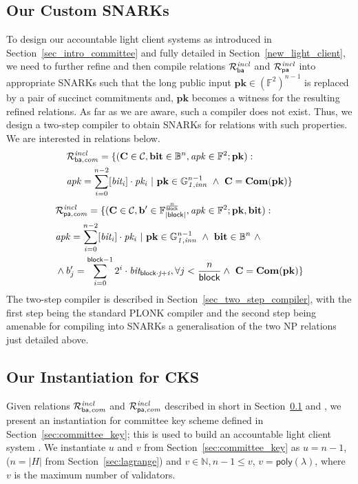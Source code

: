 \subsection{Our Custom SNARKs}
\label{sec_custom_snarks}
To design our accountable light client systems as introduced in Section~\ref{sec_intro_committee} and fully detailed in Section~\ref{new_light_client}, 
we need to further refine and then compile relations $\mathcal{R}^{\mathit{incl}}_{\mathsf{ba}}$ and $\mathcal{R}^{\mathit{incl}}_{\mathsf{pa}}$ into appropriate SNARKs such that 
the long public input $\mathbf{pk} \in ({\mathbb{F}^2})^{n-1}$ is replaced by a 
pair of succinct commitments and, $\mathbf{pk}$ becomes a witness for the resulting refined relations. As far as we are aware, such a compiler does not exist. 
Thus, we design a two-step compiler to obtain SNARKs for relations with such properties. We are interested in relations below. 
 \begin{align*}
& {\mathcal{R}^{\mathit{incl}}_{\mathsf{ba},\mathit{com}}} = \{(\mathbf{C} \in \mathcal{C}, \mathbf{bit} \in \mathbb{B}^n, \mathit{apk} \in \mathbb{F}^2; \mathbf{pk}) : \\
& \mathit{apk} = \sum_{i=0}^{n-2} [\mathit{bit_i}] \cdot \mathit{pk_i} \ | \ \mathbf{pk} \in \mathbb{G}_{\mathit{1,inn}}^{n-1} \ \wedge \  \mathbf{C} = \mathbf{Com}(\mathbf{pk}) \} 
\end{align*}
\begin{align*}
& {\Racom}  = \{(\mathbf{C} \in \mathcal{C}, \mathbf{b'} \in \mathbb{F}_{|\block|}^{\frac{n}{\block}}, \mathit{apk} \in \mathbb{F}^2;\mathbf{pk}, \mathbf{bit}) : \\
& \mathit{apk} = \sum_{i=0}^{n-2} [\mathit{bit_i}] \cdot \mathit{pk_i} \ | \ \mathbf{pk} \in \ginn{1}^{n-1} \ \wedge \ \mathbf{bit} \in \mathbb{B}^n \ \wedge\\ 
& \wedge b'_{j} = \sum_{i=0}^{\block -1}2^i \cdot \mathit{bit_{\block \cdot j + i}}, \forall j < \frac{n}{\block}  \wedge \  \mathbf{C} = \mathbf{Com}(\mathbf{pk}) \} 
\end{align*}
The two-step compiler is described  
in Section~\ref{sec_two_step_compiler}, with the first 
step being the standard PLONK compiler %
\cite{plonk} and the second step being amenable for compiling into SNARKs a %
generalisation of the two NP relations just detailed above.
\vspace{-0.05in}

\subsection{Our Instantiation for CKS}
\label{sec:inst_committee_key}
\noindent Given relations $\mathcal{R}^{\mathit{incl}}_{\mathsf{ba},\mathit{com}}$ and $\mathcal{R}^{\mathit{incl}}_{\mathsf{pa},\mathit{com}}$ described in short in Section~\ref{sec_custom_snarks} and %
, we present an instantiation for committee key scheme defined in Section~\ref{sec:committee_key}; this is used to build an accountable light client system %
. 
We instantiate $u$ and $v$ from Section~\ref{sec:committee_key} as $u = n-1$, ($n=|H|$ from 
Section~\ref{sec:lagrange}) and $v \in \mathbb{N}, n-1 \leq v$, $v = \mathsf{poly}(\lambda)$, where $v$ is the 
maximum number of validators.

